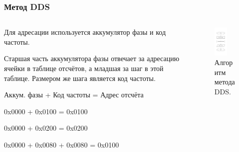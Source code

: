 \documentclass[10pt]{beamer}
\begin{document}
\begin{frame}
\frametitle{Метод DDS}
\begin{columns}
\begin{column}{0.55\textwidth}
  	Для адресации используется аккумулятор фазы и код частоты. 
\vspace{0.25cm}

	Старшая часть аккумулятора фазы отвечает за адресацию ячейки в таблице отсчётов, а младшая за шаг в этой таблице. Размером же шага является код частоты.

\vspace{0.25cm}
	Аккум. фазы + Код частоты = Адрес отсчёта 
	
	0x0000 + 0x0100 = 0x0100

	0x0000 + 0x0200 = 0x0200
	
	0x0000 + 0x0080 + 0x0080 = 0x0100
\end{column}
\begin{column}{0.45\textwidth}  
    \begin{center}
    \begin{figure}
    \includegraphics[width=0.6\textwidth]{dds_block}
     \caption*{Алгоритм метода DDS.}
    \end{figure}
     \end{center}
\end{column}
\end{columns}
\end{frame}
\end{document}
